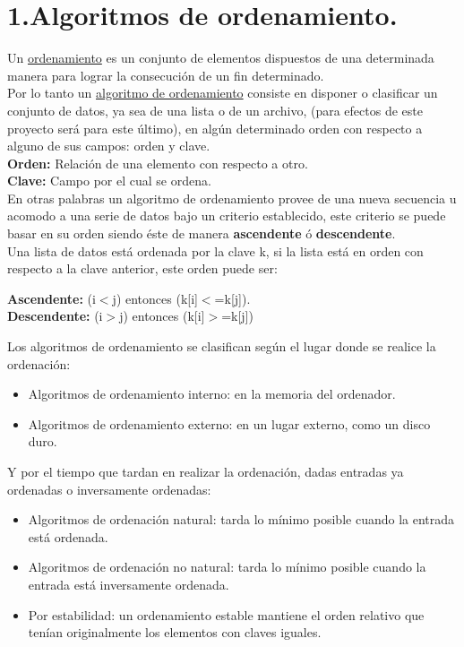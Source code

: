 \documentclass[12pt,letterpaper]{report}
\begin{document}
\section*{\centering \LARGE 1.Algoritmos de ordenamiento.}
Un \underline{ordenamiento} es un conjunto de elementos dispuestos de una determinada manera para lograr la consecución de un fin determinado.                                    
\\ Por lo tanto un \underline{algoritmo de ordenamiento} consiste en disponer o clasificar un conjunto de datos, ya sea de una lista o de un archivo, (para efectos de este proyecto será para este último), en algún determinado orden con respecto a alguno de sus campos: orden y clave. \\
\textbf{Orden:} Relación de una elemento con respecto a otro.\\
\textbf{Clave:} Campo por el cual se ordena.\\
En otras palabras un algoritmo de ordenamiento provee de una nueva secuencia u acomodo a una serie de datos bajo un criterio establecido, este criterio se puede basar en su orden siendo éste de manera \textbf{ascendente} ó \textbf{descendente}.\\
Una lista de datos está ordenada por la clave k, si la lista está en orden con respecto a la clave anterior, este orden puede ser:
\begin{center}
\textbf{Ascendente:} (i$<$j) entonces (k[i]$<$=k[j]). \\
\textbf{Descendente:} (i$>$j) entonces (k[i]$>$=k[j]) \\
\end{center}
Los algoritmos de ordenamiento se clasifican según el lugar donde se realice la ordenación:
\begin{itemize}
    \item Algoritmos de ordenamiento interno: en la memoria del ordenador.
    \item Algoritmos de ordenamiento externo: en un lugar externo, como un disco duro.
\end{itemize}
Y por el tiempo que tardan en realizar la ordenación, dadas entradas ya ordenadas o inversamente ordenadas:
\begin{itemize}
    \item Algoritmos de ordenación natural: tarda lo mínimo posible cuando la entrada está ordenada.
    \item Algoritmos de ordenación no natural: tarda lo mínimo posible cuando la entrada está inversamente ordenada.
	\item Por estabilidad: un ordenamiento estable mantiene el orden relativo que tenían originalmente los elementos con claves iguales.
\end{itemize}
\end{document}

